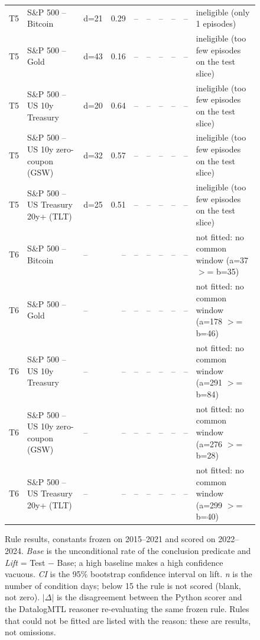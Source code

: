 \begin{figure}
\begin{tabular}{lllrrrrrrl}
T5 & S\&P 500 -- Bitcoin & d=21 & 0.29 & -- & -- & -- & -- & -- & ineligible (only 1 episodes) \\
T5 & S\&P 500 -- Gold & d=43 & 0.16 & -- & -- & -- & -- & -- & ineligible (too few episodes on the test slice) \\
T5 & S\&P 500 -- US 10y Treasury & d=20 & 0.64 & -- & -- & -- & -- & -- & ineligible (too few episodes on the test slice) \\
T5 & S\&P 500 -- US 10y zero-coupon (GSW) & d=32 & 0.57 & -- & -- & -- & -- & -- & ineligible (too few episodes on the test slice) \\
T5 & S\&P 500 -- US Treasury 20y+ (TLT) & d=25 & 0.51 & -- & -- & -- & -- & -- & ineligible (too few episodes on the test slice) \\
T6 & S\&P 500 -- Bitcoin & -- & -- & -- & -- & -- & -- & -- & not fitted: no common window (a=37 $>$= b=35) \\
T6 & S\&P 500 -- Gold & -- & -- & -- & -- & -- & -- & -- & not fitted: no common window (a=178 $>$= b=46) \\
T6 & S\&P 500 -- US 10y Treasury & -- & -- & -- & -- & -- & -- & -- & not fitted: no common window (a=291 $>$= b=84) \\
T6 & S\&P 500 -- US 10y zero-coupon (GSW) & -- & -- & -- & -- & -- & -- & -- & not fitted: no common window (a=276 $>$= b=28) \\
T6 & S\&P 500 -- US Treasury 20y+ (TLT) & -- & -- & -- & -- & -- & -- & -- & not fitted: no common window (a=299 $>$= b=40) \\
\bottomrule
\end{tabular}
\caption{Rule results, constants frozen on 2015--2021 and scored on 2022--2024. \emph{Base} is the unconditional rate of the conclusion predicate and \emph{Lift} = Test $-$ Base; a high baseline makes a high confidence vacuous. \emph{CI} is the 95\% bootstrap confidence interval on lift. \emph{n} is the number of condition days; below 15 the rule is not scored (blank, not zero). $|\Delta|$ is the disagreement between the Python scorer and the DatalogMTL reasoner re-evaluating the same frozen rule. Rules that could not be fitted are listed with the reason: these are results, not omissions.}
\label{tab:rule-results}
\end{figure}
